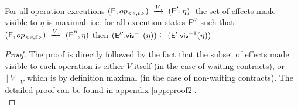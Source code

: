 %
%
\begin{theorem}
\label{theorem:two}
For all operation executions 
$({\normalfont \textsf{E}},op_{<s,i>}) 
    \;\xrightarrow{V}\;
  ({\normalfont \textsf{E}}',\eta) 
,$
the set of effects made visible to $\eta$ is maximal. i.e. for all
execution states ${\normalfont \textsf{E}}''$ such that:
$({\normalfont \textsf{E}},op_{<s,i>})\;\xrightarrow{V}\;({\normalfont \textsf{E}}'',\eta)$
then    
$\small ({\normalfont \textsf{E}}''.{\normalfont \textsf{vis}}^{-1}(\eta)) \subseteq
({\normalfont \textsf{E}}'.{\normalfont \textsf{vis}}^{-1}(\eta))$
\end{theorem}
\begin{proof}
The proof is directly followed by the fact that the subset of effects
made visible to each operation is either $V$ itself (in the case of
waiting contracts), or $\left \lfloor V
\right \rfloor_V$ which is by definition maximal (in the case of
non-waiting contracts). The detailed proof can be found in appendix
\ref{app:proof2}. \\
\end{proof}



